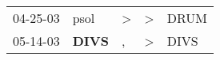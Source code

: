 \begin{supertabular}{p{0.07\textwidth}p{0.06\textwidth}p{0.02\textwidth}p{0.02\textwidth}p{0.06\textwidth}}
 04-25-03\textsuperscript{} &           psol\textsuperscript{} &  \textgreater &  \textgreater &  DRUM\textsuperscript{} \\
 05-14-03\textsuperscript{} &  \textbf{DIVS\textsuperscript{}} &             , &  \textgreater &  DIVS\textsuperscript{} \\
\end{supertabular}
